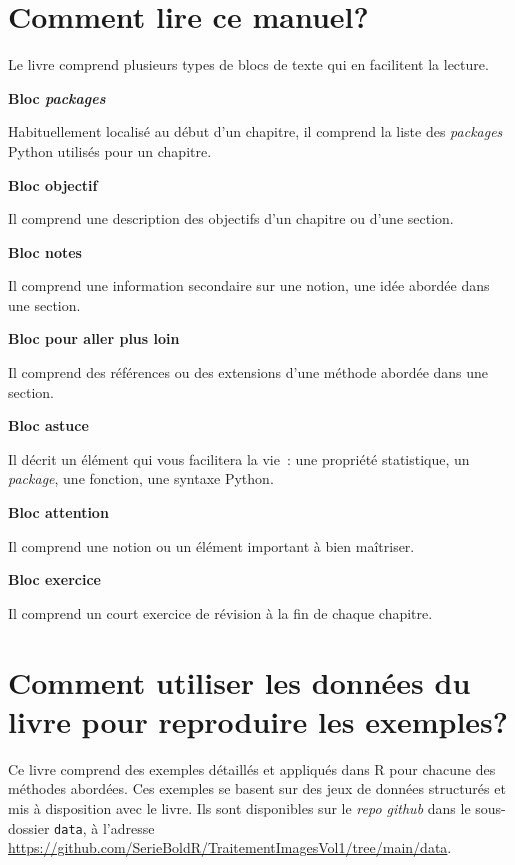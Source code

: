 \documentclass[
  letterpaper,
  DIV=11,
  numbers=noendperiod]{scrreprt}
\begin{document}
\section*{Comment lire ce manuel?}\label{sect002}


Le livre comprend plusieurs types de blocs de texte qui en facilitent la
lecture.

\textbf{Bloc \emph{packages}}

Habituellement localisé au début d'un chapitre, il comprend la liste des
\emph{packages} Python utilisés pour un chapitre.

\textbf{Bloc objectif}

Il comprend une description des objectifs d'un chapitre ou d'une
section.

\textbf{Bloc notes}

Il comprend une information secondaire sur une notion, une idée abordée
dans une section.

\textbf{Bloc pour aller plus loin}

Il comprend des références ou des extensions d'une méthode abordée dans
une section.

\textbf{Bloc astuce}

Il décrit un élément qui vous facilitera la vie~: une propriété
statistique, un \emph{package}, une fonction, une syntaxe Python.

\textbf{Bloc attention}

Il comprend une notion ou un élément important à bien maîtriser.

\textbf{Bloc exercice}

Il comprend un court exercice de révision à la fin de chaque chapitre.

\section*{Comment utiliser les données du livre pour reproduire les
exemples?}\label{sect003}


Ce livre comprend des exemples détaillés et appliqués dans R pour
chacune des méthodes abordées. Ces exemples se basent sur des jeux de
données structurés et mis à disposition avec le livre. Ils sont
disponibles sur le \emph{repo github} dans le sous-dossier
\texttt{data}, à l'adresse
\url{https://github.com/SerieBoldR/TraitementImagesVol1/tree/main/data}.
\end{document}
